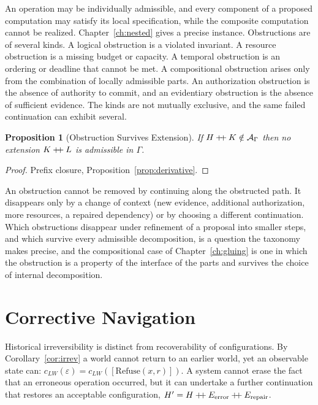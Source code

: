 \documentclass[12pt,oneside,openany]{book}
\theoremstyle{spherepop}
\newtheorem{proposition}[definition]{Proposition}
\theoremstyle{remarkstyle}
\newcommand{\Rfuse}{\mathrm{Refuse}}
\newcommand{\hconcat}{\mathbin{+\mkern-5mu+}}
\begin{document}
An operation may be individually admissible, and every component of a proposed computation may satisfy its local specification, while the composite computation cannot be realized. Chapter~\ref{ch:nested} gives a precise instance. Obstructions are of several kinds. A logical obstruction is a violated invariant. A resource obstruction is a missing budget or capacity. A temporal obstruction is an ordering or deadline that cannot be met. A compositional obstruction arises only from the combination of locally admissible parts. An authorization obstruction is the absence of authority to commit, and an evidentiary obstruction is the absence of sufficient evidence. The kinds are not mutually exclusive, and the same failed continuation can exhibit several.

\begin{proposition}[Obstruction Survives Extension]
If $H\hconcat K\notin\mathcal A_\Gamma$ then no extension $K\hconcat L$ is admissible in $\Gamma$.
\end{proposition}

\begin{proof}
Prefix closure, Proposition~\ref{prop:derivative}.
\end{proof}

An obstruction cannot be removed by continuing along the obstructed path. It disappears only by a change of context (new evidence, additional authorization, more resources, a repaired dependency) or by choosing a different continuation. Which obstructions disappear under refinement of a proposal into smaller steps, and which survive every admissible decomposition, is a question the taxonomy makes precise, and the compositional case of Chapter~\ref{ch:gluing} is one in which the obstruction is a property of the interface of the parts and survives the choice of internal decomposition.

\section{Corrective Navigation}

Historical irreversibility is distinct from recoverability of configurations. By Corollary~\ref{cor:irrev} a world cannot return to an earlier world, yet an observable state can: $c_{LW}(\varepsilon)=c_{LW}([\Rfuse(x,r)])$. A system cannot erase the fact that an erroneous operation occurred, but it can undertake a further continuation that restores an acceptable configuration, $H'=H\hconcat E_{\mathrm{error}}\hconcat E_{\mathrm{repair}}$.
\end{document}
